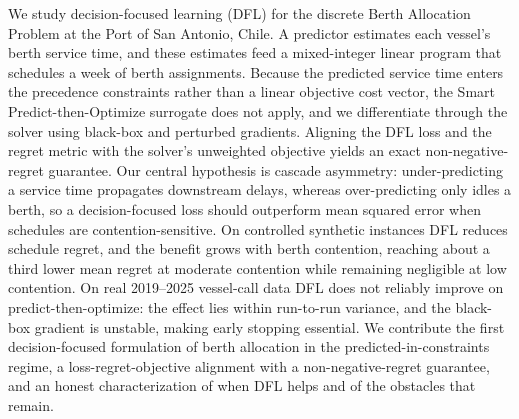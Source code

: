 We study decision-focused learning (DFL) for the discrete Berth Allocation Problem at the Port of San Antonio, Chile. A predictor estimates each vessel's berth service time, and these estimates feed a mixed-integer linear program that schedules a week of berth assignments. Because the predicted service time enters the precedence constraints rather than a linear objective cost vector, the Smart Predict-then-Optimize surrogate does not apply, and we differentiate through the solver using black-box and perturbed gradients. Aligning the DFL loss and the regret metric with the solver's unweighted objective yields an exact non-negative-regret guarantee. Our central hypothesis is cascade asymmetry: under-predicting a service time propagates downstream delays, whereas over-predicting only idles a berth, so a decision-focused loss should outperform mean squared error when schedules are contention-sensitive. On controlled synthetic instances DFL reduces schedule regret, and the benefit grows with berth contention, reaching about a third lower mean regret at moderate contention while remaining negligible at low contention. On real 2019--2025 vessel-call data DFL does not reliably improve on predict-then-optimize: the effect lies within run-to-run variance, and the black-box gradient is unstable, making early stopping essential. We contribute the first decision-focused formulation of berth allocation in the predicted-in-constraints regime, a loss-regret-objective alignment with a non-negative-regret guarantee, and an honest characterization of when DFL helps and of the obstacles that remain.
